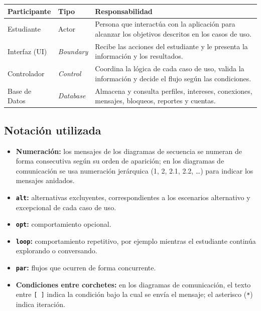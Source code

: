 \documentclass[11pt,a4paper]{article}
\begin{document}
\begin{center}
\begin{tabularx}{\textwidth}{|l|l|X|}
\hline
\rowcolor{gray!25}
\textbf{Participante} & \textbf{Tipo} & \textbf{Responsabilidad} \\
\hline
Estudiante & Actor & Persona que interactúa con la aplicación para alcanzar los objetivos descritos en los casos de uso. \\
\hline
Interfaz (UI) & \textit{Boundary} & Recibe las acciones del estudiante y le presenta la información y los resultados. \\
\hline
Controlador & \textit{Control} & Coordina la lógica de cada caso de uso, valida la información y decide el flujo según las condiciones. \\
\hline
Base de Datos & \textit{Database} & Almacena y consulta perfiles, intereses, conexiones, mensajes, bloqueos, reportes y cuentas. \\
\hline
\end{tabularx}
\end{center}

\subsection{Notación utilizada}

\begin{itemize}
    \item \textbf{Numeración:} los mensajes de los diagramas de secuencia se
    numeran de forma consecutiva según su orden de aparición; en los diagramas
    de comunicación se usa numeración jerárquica (1, 2, 2.1, 2.2, \dots) para
    indicar los mensajes anidados.
    \item \textbf{\texttt{alt}:} alternativas excluyentes, correspondientes a los
    escenarios alternativo y excepcional de cada caso de uso.
    \item \textbf{\texttt{opt}:} comportamiento opcional.
    \item \textbf{\texttt{loop}:} comportamiento repetitivo, por ejemplo mientras
    el estudiante continúa explorando o conversando.
    \item \textbf{\texttt{par}:} flujos que ocurren de forma concurrente.
    \item \textbf{Condiciones entre corchetes:} en los diagramas de comunicación,
    el texto entre \texttt{[ ]} indica la condición bajo la cual se envía el
    mensaje; el asterisco (\texttt{*}) indica iteración.
\end{itemize}
\end{document}
